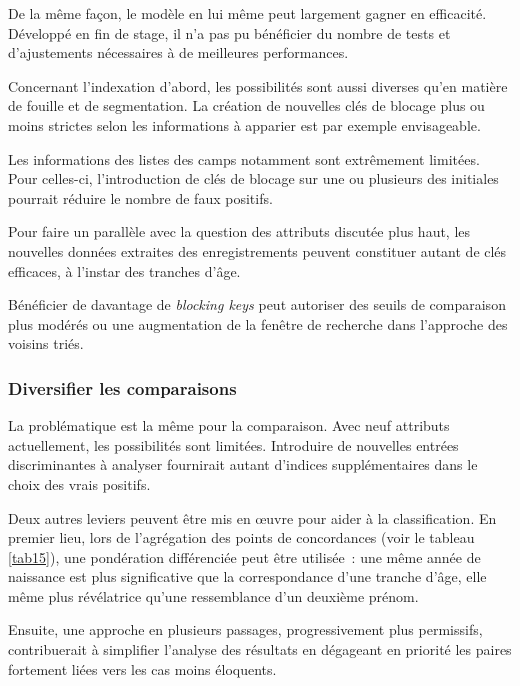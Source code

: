 \documentclass[a4paper,12pt,twoside]{book}
\begin{document}
                    De la même façon, le modèle en lui même peut largement gagner en efficacité. Développé en fin de stage, il n'a pas pu bénéficier du nombre de tests et d'ajustements nécessaires à de meilleures performances.
                    
                    Concernant l'indexation d'abord, les possibilités sont aussi diverses qu'en matière de fouille et de segmentation. La création de nouvelles clés de blocage plus ou moins strictes selon les informations à apparier est par exemple envisageable.
                    
                    Les informations des listes des camps notamment sont extrêmement limitées. Pour celles-ci, l'introduction de clés de blocage sur une ou plusieurs des initiales pourrait réduire le nombre de faux positifs.
                    
                    Pour faire un parallèle avec la question des attributs discutée plus haut, les nouvelles données extraites des enregistrements peuvent constituer autant de clés efficaces, à l'instar des tranches d'âge.
                    
                    Bénéficier de davantage de \textit{blocking keys} peut autoriser des seuils de comparaison plus modérés ou une augmentation de la fenêtre de recherche dans l'approche des voisins triés.  
                
                \subsubsection{Diversifier les comparaisons}
                
                    La problématique est la même pour la comparaison. Avec neuf attributs actuellement, les possibilités sont limitées. Introduire de nouvelles entrées discriminantes à analyser fournirait autant d'indices supplémentaires dans le choix des vrais positifs.
                    
                    Deux autres leviers peuvent être mis en œuvre pour aider à la classification. En premier lieu, lors de l'agrégation des points de concordances (voir le tableau \ref{tab15}), une pondération différenciée peut être utilisée~: une même année de naissance est plus significative que la correspondance d'une tranche d'âge, elle même plus révélatrice qu'une ressemblance d'un deuxième prénom.
                    
                    Ensuite, une approche en plusieurs passages, progressivement plus permissifs, contribuerait à simplifier l'analyse des résultats en dégageant en priorité les paires fortement liées vers les cas moins éloquents.
                
\end{document}
